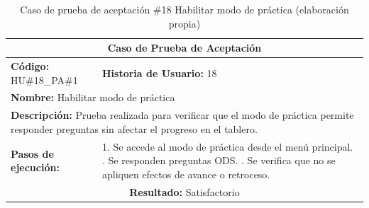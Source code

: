 \begin{table}[H]
\centering
\caption{Caso de prueba de aceptación \#18 Habilitar modo de práctica (elaboración propia)\label{tab:cpa18}}
\renewcommand{\arraystretch}{1.3}
\begin{tabular}{|p{}|p{}|}
\hline
\multicolumn{2}{|c|}{\textbf{Caso de Prueba de Aceptación}} \\
\hline
\textbf{Código:} HU\#18\_PA\#1 & \textbf{Historia de Usuario:} 18 \\
\hline
\multicolumn{2}{|l|}{\textbf{Nombre:} Habilitar modo de práctica} \\
\hline
\multicolumn{2}{|p{0.9\textwidth}|}{\textbf{Descripción:} Prueba realizada para verificar que el modo de práctica permite responder preguntas sin afectar el progreso en el tablero.} \\
\hline
\textbf{Pasos de ejecución:} & 1. Se accede al modo de práctica desde el menú principal. \newline 2. Se responden preguntas ODS. \newline 3. Se verifica que no se apliquen efectos de avance o retroceso. \\
\hline
\multicolumn{2}{|c|}{\textbf{Resultado:} Satisfactorio} \\
\hline
\end{tabular}
\end{table}
